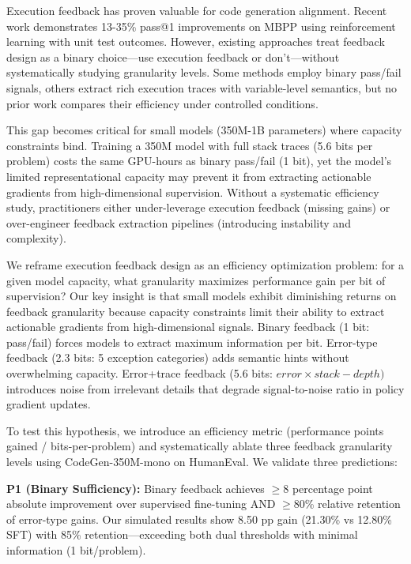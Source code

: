 
Execution feedback has proven valuable for code generation alignment. Recent work demonstrates 13-35\% pass@1 improvements on MBPP using reinforcement learning with unit test outcomes. However, existing approaches treat feedback design as a binary choice---use execution feedback or don't---without systematically studying granularity levels. Some methods employ binary pass/fail signals, others extract rich execution traces with variable-level semantics, but no prior work compares their efficiency under controlled conditions.

This gap becomes critical for small models (350M-1B parameters) where capacity constraints bind. Training a 350M model with full stack traces (5.6 bits per problem) costs the same GPU-hours as binary pass/fail (1 bit), yet the model's limited representational capacity may prevent it from extracting actionable gradients from high-dimensional supervision. Without a systematic efficiency study, practitioners either under-leverage execution feedback (missing gains) or over-engineer feedback extraction pipelines (introducing instability and complexity).

We reframe execution feedback design as an efficiency optimization problem: for a given model capacity, what granularity maximizes performance gain per bit of supervision? Our key insight is that small models exhibit diminishing returns on feedback granularity because capacity constraints limit their ability to extract actionable gradients from high-dimensional signals. Binary feedback (1 bit: pass/fail) forces models to extract maximum information per bit. Error-type feedback (2.3 bits: 5 exception categories) adds semantic hints without overwhelming capacity. Error+trace feedback (5.6 bits: $error\times stack-depth)$ introduces noise from irrelevant details that degrade signal-to-noise ratio in policy gradient updates.

To test this hypothesis, we introduce an efficiency metric (performance points gained / bits-per-problem) and systematically ablate three feedback granularity levels using CodeGen-350M-mono on HumanEval. We validate three predictions:

\textbf{P1 (Binary Sufficiency):} Binary feedback achieves $\geq 8$ percentage point absolute improvement over supervised fine-tuning AND $\geq 80$\% relative retention of error-type gains. Our simulated results show 8.50 pp gain (21.30\% vs 12.80\% SFT) with 85\% retention---exceeding both dual thresholds with minimal information (1 bit/problem).


